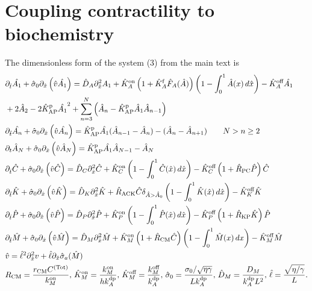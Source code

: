 \documentclass[11pt]{article}
\newcommand{\6}[1]{#1_{\text{6}}}
\newcommand{\3}[1]{#1_{\text{3}}}
\newcommand{\Tot}[1]{#1^\text{(Tot)}}
\newcommand{\My}[1]{#1_M}
\begin{document}
\section{Coupling contractility to biochemistry \label{sec:WithMy}}
The dimensionless form of the system (3) from the main text is
\begin{subequations}
\label{eq:Everything}
\begin{align}
& \Dthat \hat{\MA} +\hat{\sigma}_0  \Dxhat \left(\hat{v} \hat{\MA} \right)  = \DhatA \Dxhat^2 \MA +\KhatonA \left(1+\KhatfA \hat F_A(\hat A) \right)\left(1 - \int_0^1 \hat A(x) \, d\hat{x} \right)- \KhatoffA \hat{\MA} \\ \nonumber
 &+ 2 \hat{A}_2-2\KhatpAP \hat{\MA}^2+\sum_{n=3}^N \left(\hat A_n-\KhatpAP \hat A_1 \hat A_{n-1}\right)  \\
&\Dthat \hat{\PA} +\hat{\sigma}_0  \Dxhat \left(\hat{v} \hat{\PA} \right) =\KhatpAP \hat{\MA} (\hat A_{n-1}-\hat A_n) - (\hat A_n-\hat A_{n+1})  \qquad N > n \geq 2 \\ 
& \Dt \hat A_N +\hat{\sigma}_0  \Dxhat \left(\hat{v} \hat A_N \right)  =\KhatpAP \hat \MA \hat A_{N-1}- \hat A_N \\ 
&\Dthat \hat{C}+\hat{\sigma}_0  \Dxhat \left(\hat{v} \hat{C} \right)  =\DhatC \Dxhat^2 \hat{C} +\KhatonC \left(1 - \int_0^1 \hat{C}(\hat x) \, d\hat{x} \right)  - \KhatoffC \left(1+\hat{R}_\text{PC}\hat P\right)\hat{C}\\
&\Dthat \hat{K} +\hat{\sigma}_0  \Dxhat \left(\hat{v} \hat{K} \right) = \DhatK \Dxhat^2 \hat{K} + \hat{R}_\text{ACK} \hat{C} \delta_{\hat A > \hat A_0} \left(1 - \int_0^1 \hat{K}(\hat x) \, d\hat{x} \right)-\KhatoffK \hat{K} \\
&\Dthat \hat{P} +\hat{\sigma}_0  \Dxhat \left(\hat{v} \hat{P} \right)  =\DhatP \Dxhat^2 \hat{P} +\KhatonP \left(1 - \int_0^1 \hat{P}(\hat x) \, d\hat{x} \right)  - \KhatoffP \left(1+\hat{R}_\text{KP}\hat{K}\right)\hat{P}\\
&\Dthat \hat{M} +\hat{\sigma}_0  \Dxhat \left(\hat{v} \hat{M} \right) =\hat{D}_M \Dxhat^2 \hat{M} +\KhatonM \left(1+\hat{R}_\text{CM} \hat C\right) \left(1-\int_0^1  \hat{M}(x) \, dx\right)- \KhatoffM \hat{M}\\
&\hat{v} = \hat{\ell}^2 \Dxhat^2 v +\hat{\ell} \Dxhat \hat{\sigma}_a(\hat{M})\\
\label{eq:NewNDs}
&R_\text{CM}=\frac{r_\text{CM}\Tot{C}}{\kon_M},\, \hat{K}^\text{on}_M= \frac{\My{\kon}}{h \kdp_A}, \, \hat{K}^\text{off}_M= \frac{\My{\koff}}{\kdp_A},\, \hat{\sigma}_0 = \frac{\sigma_0/ \sqrt{\eta \gamma} }{L \kdp_A},   \, \hat{D}_M =\frac{D_M}{\kdp_A L^2}, \, \hat{\ell} = \frac{\sqrt{\eta/\gamma}}{L}.
\end{align}
\end{subequations}
\end{document}
